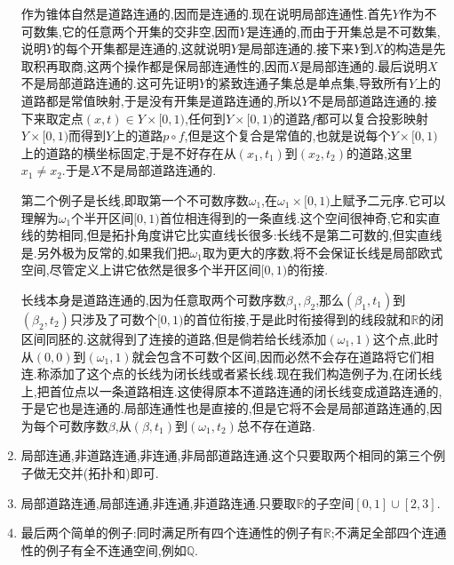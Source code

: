 \begin{enumerate}
	作为锥体自然是道路连通的,因而是连通的.现在说明局部连通性.首先$Y$作为不可数集,它的任意两个开集的交非空,因而$Y$是连通的,而由于开集总是不可数集,说明$Y$的每个开集都是连通的,这就说明$Y$是局部连通的.接下来$Y$到$X$的构造是先取积再取商,这两个操作都是保局部连通性的,因而$X$是局部连通的.最后说明$X$不是局部道路连通的.这可先证明$Y$的紧致连通子集总是单点集,导致所有$Y$上的道路都是常值映射,于是没有开集是道路连通的,所以$Y$不是局部道路连通的.接下来取定点$(x,t)\in Y\times[0,1)$,任何到$Y\times[0,1)$的道路$f$都可以复合投影映射$Y\times[0,1)$而得到$Y$上的道路$p\circ f$,但是这个复合是常值的,也就是说每个$Y\times[0,1)$上的道路的横坐标固定,于是不好存在从$(x_1,t_1)$到$(x_2,t_2)$的道路,这里$x_1\not=x_2$.于是$X$不是局部道路连通的.
	
	第二个例子是长线,即取第一个不可数序数$\omega_1$,在$\omega_1\times[0,1)$上赋予二元序.它可以理解为$\omega_1$个半开区间$[0,1)$首位相连得到的一条直线.这个空间很神奇,它和实直线的势相同,但是拓扑角度讲它比实直线长很多:长线不是第二可数的,但实直线是.另外极为反常的,如果我们把$\omega_1$取为更大的序数,将不会保证长线是局部欧式空间,尽管定义上讲它依然是很多个半开区间$[0,1)$的衔接.
	
	长线本身是道路连通的,因为任意取两个可数序数$\beta_1,\beta_2$,那么$(\beta_1,t_1)$到$(\beta_2,t_2)$只涉及了可数个$[0,1)$的首位衔接,于是此时衔接得到的线段就和$\mathbb{R}$的闭区间同胚的.这就得到了连接的道路,但是倘若给长线添加$(\omega_1,1)$这个点,此时从$(0,0)$到$(\omega_1,1)$就会包含不可数个区间,因而必然不会存在道路将它们相连.称添加了这个点的长线为闭长线或者紧长线.现在我们构造例子为,在闭长线上,把首位点以一条道路相连.这使得原本不道路连通的闭长线变成道路连通的,于是它也是连通的.局部连通性也是直接的,但是它将不会是局部道路连通的,因为每个可数序数$\beta$,从$(\beta,t_1)$到$(\omega_1,t_2)$总不存在道路.
	\item 局部连通,非道路连通,非连通,非局部道路连通.这个只要取两个相同的第三个例子做无交并(拓扑和)即可.
	\item 局部道路连通,局部连通,非连通,非道路连通.只要取$\mathbb{R}$的子空间$[0,1]\cup[2,3]$.
	\item 最后两个简单的例子:同时满足所有四个连通性的例子有$\mathbb{R}$;不满足全部四个连通性的例子有全不连通空间,例如$\mathbb{Q}$.
\end{enumerate}

